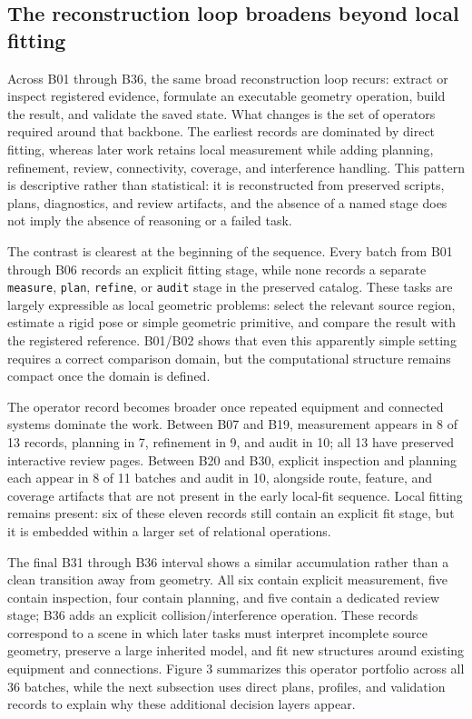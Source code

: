 \documentclass[10pt,a4paper]{article}
\begin{document}
\hypertarget{the-reconstruction-loop-broadens-beyond-local-fitting}{%
\subsection{The reconstruction loop broadens beyond local
fitting}\label{the-reconstruction-loop-broadens-beyond-local-fitting}}

Across B01 through B36, the same broad reconstruction loop recurs:
extract or inspect registered evidence, formulate an executable geometry
operation, build the result, and validate the saved state. What changes
is the set of operators required around that backbone. The earliest
records are dominated by direct fitting, whereas later work retains
local measurement while adding planning, refinement, review,
connectivity, coverage, and interference handling. This pattern is
descriptive rather than statistical: it is reconstructed from preserved
scripts, plans, diagnostics, and review artifacts, and the absence of a
named stage does not imply the absence of reasoning or a failed task.

The contrast is clearest at the beginning of the sequence. Every batch
from B01 through B06 records an explicit fitting stage, while none
records a separate \texttt{measure}, \texttt{plan}, \texttt{refine}, or
\texttt{audit} stage in the preserved catalog. These tasks are largely
expressible as local geometric problems: select the relevant source
region, estimate a rigid pose or simple geometric primitive, and compare
the result with the registered reference. B01/B02 shows that even this
apparently simple setting requires a correct comparison domain, but the
computational structure remains compact once the domain is defined.

The operator record becomes broader once repeated equipment and
connected systems dominate the work. Between B07 and B19, measurement
appears in 8 of 13 records, planning in 7, refinement in 9, and audit in
10; all 13 have preserved interactive review pages. Between B20 and B30,
explicit inspection and planning each appear in 8 of 11 batches and
audit in 10, alongside route, feature, and coverage artifacts that are
not present in the early local-fit sequence. Local fitting remains
present: six of these eleven records still contain an explicit fit
stage, but it is embedded within a larger set of relational operations.

The final B31 through B36 interval shows a similar accumulation rather
than a clean transition away from geometry. All six contain explicit
measurement, five contain inspection, four contain planning, and five
contain a dedicated review stage; B36 adds an explicit
collision/interference operation. These records correspond to a scene in
which later tasks must interpret incomplete source geometry, preserve a
large inherited model, and fit new structures around existing equipment
and connections. Figure 3 summarizes this operator portfolio across all
36 batches, while the next subsection uses direct plans, profiles, and
validation records to explain why these additional decision layers
appear.
\end{document}
